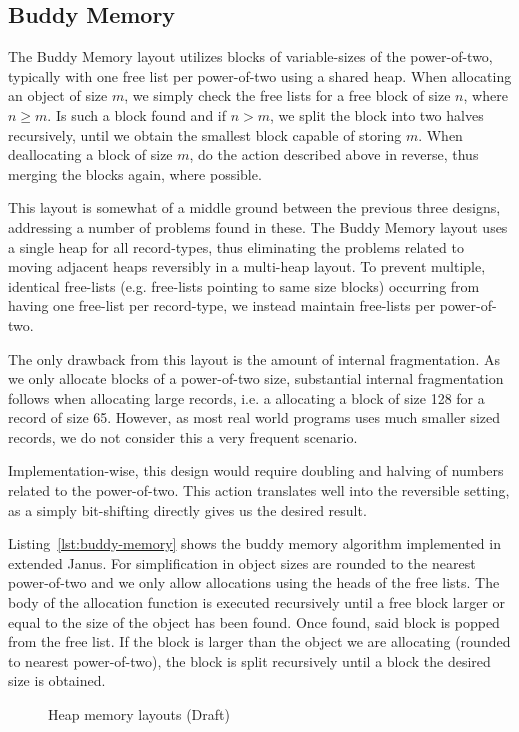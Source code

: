 
\subsection{Buddy Memory}
\label{sec:buddy-memory}
The Buddy Memory layout utilizes blocks of variable-sizes of the power-of-two, typically with one free list per power-of-two using a shared heap. When allocating an object of size $m$, we simply check the free lists for a free block of size $n$, where $n \geq m$. Is such a block found and if $n > m$, we split the block into two halves recursively, until we obtain the smallest block capable of storing $m$. When deallocating a block of size $m$, do the action described above in reverse, thus merging the blocks again, where possible.

This layout is somewhat of a middle ground between the previous three designs, addressing a number of problems found in these. The Buddy Memory layout uses a single heap for all record-types, thus eliminating the problems related to moving adjacent heaps reversibly in a multi-heap layout. To prevent multiple, identical free-lists (e.g. free-lists pointing to same size blocks) occurring from having one free-list per record-type, we instead maintain free-lists per power-of-two.

The only drawback from this layout is the amount of internal fragmentation. As we only allocate blocks of a power-of-two size, substantial internal fragmentation follows when allocating large records, i.e. a allocating a block of size 128 for a record of size 65. However, as most real world programs uses much smaller sized records, we do not consider this a very frequent scenario.

Implementation-wise, this design would require doubling and halving of numbers related to the power-of-two. This action translates well into the reversible setting, as a simply bit-shifting directly gives us the desired result.



Listing~\ref{lst:buddy-memory} shows the buddy memory algorithm implemented in extended Janus. For simplification in object sizes are rounded to the nearest power-of-two and we only allow allocations using the heads of the free lists.
The body of the allocation function is executed recursively until a free block larger or equal to the size of the object has been found. Once found, said block is popped from the free list. If the block is larger than the object we are allocating (rounded to nearest power-of-two), the block is split recursively until a block the desired size is obtained.



\begin{figure}[H]
  \centering
  \caption{Heap memory layouts (Draft)}
\end{figure}

